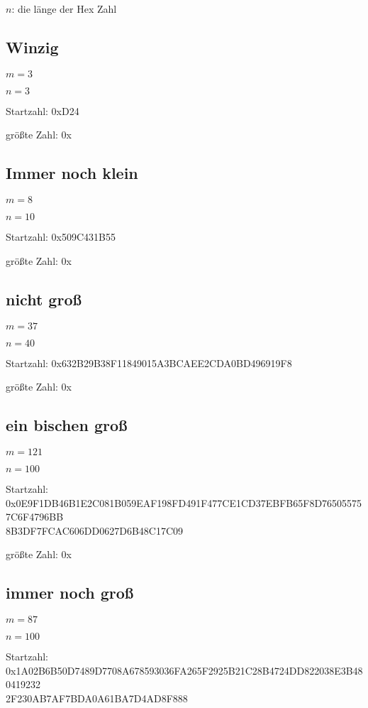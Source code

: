 \documentclass[a4paper,10pt,ngerman]{scrartcl}
\begin{document}
\noindent $n$: die länge der Hex Zahl

\subsection{Winzig}

\noindent $m=3$

\noindent $n=3$

\noindent Startzahl: 0xD24

\noindent größte Zahl: 0x

\subsection{Immer noch klein}

\noindent $m=8$

\noindent $n=10$

\noindent Startzahl: 0x509C431B55

\noindent größte Zahl: 0x

\subsection{nicht groß}

\noindent $m=37$

\noindent $n=40$

\noindent Startzahl: 0x632B29B38F11849015A3BCAEE2CDA0BD496919F8

\noindent größte Zahl: 0x

\subsection{ein bischen groß}

\noindent $m=121$

\noindent $n=100$

\noindent Startzahl: 0x0E9F1DB46B1E2C081B059EAF198FD491F477CE1CD37EBFB65F8D765055757C6F4796BB\\8B3DF7FCAC606DD0627D6B48C17C09

\noindent größte Zahl: 0x

\subsection{immer noch groß}

\noindent $m=87$

\noindent $n=100$

\noindent Startzahl: 0x1A02B6B50D7489D7708A678593036FA265F2925B21C28B4724DD822038E3B480419232\\2F230AB7AF7BDA0A61BA7D4AD8F888
\end{document}
